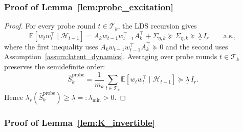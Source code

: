 \documentclass{article}
\newcommand{\E}{\mathbb{E}}
\newcommand{\cH}{\mathcal{H}}
\newcommand{\cT}{\mathcal{T}}
\begin{document}
\subsubsection{Proof of Lemma~\ref{lem:probe_excitation}}
\label{proof:probe_excitation}

\begin{proof}
For every probe round $t \in \cT_k$, the LDS recursion gives
\[
\E[w_t w_t^\top \mid \cH_{t-1}]
= A_k w_{t-1} w_{t-1}^\top A_k^\top + \Sigma_{\eta,k}
\succeq \Sigma_{\eta,k}
\succeq \underline{\lambda}\, I_r
\qquad \text{a.s.},
\]
where the first inequality uses $A_k w_{t-1} w_{t-1}^\top A_k^\top \succeq 0$ and the second uses Assumption~\ref{assum:latent_dynamics}.
Averaging over probe rounds $t \in \cT_k$ preserves the semidefinite order:
\[
\bar S_k^{\mathrm{probe}}
= \frac{1}{m_k}\sum_{t \in \cT_k} \E[w_t w_t^\top \mid \cH_{t-1}]
\succeq \underline{\lambda}\, I_r.
\]
Hence $\lambda_r(\bar S_k^{\mathrm{probe}}) \ge \underline{\lambda} =: \lambda_{\min} > 0$.
\end{proof}

\subsubsection{Proof of Lemma~\ref{lem:K_invertible}}
\label{proof:K_invertible}
\end{document}
